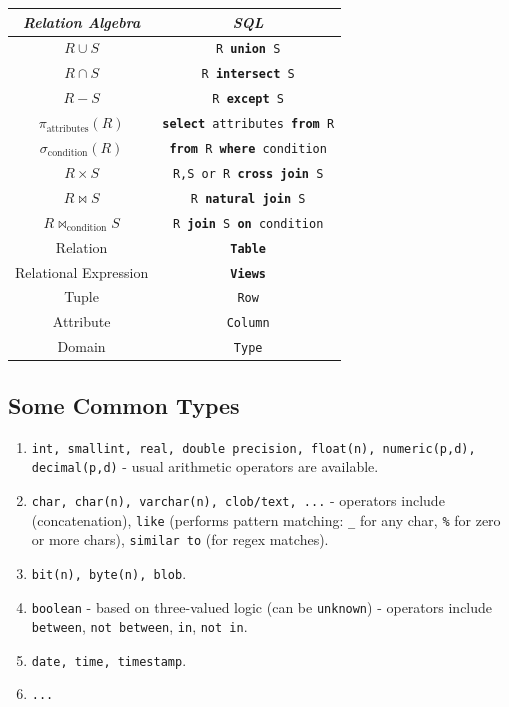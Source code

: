 \documentclass[twocolumn,english]{article}
\providecommand{\tabularnewline}{\\}
\providecommand{\tabularnewline}{\\}
\begin{document}
\noindent 
\begin{table}[H]
\noindent \centering{}%
\begin{tabular}{cc}
\toprule 
\addlinespace
\emph{Relation Algebra}  & \emph{SQL}\tabularnewline
\midrule
\addlinespace
$R\cup S$  & \texttt{R }\texttt{\textbf{union}}\texttt{ S}\tabularnewline
\addlinespace
$R\cap S$  & \texttt{R }\texttt{\textbf{intersect}}\texttt{ S}\tabularnewline
\addlinespace
$R-S$  & \texttt{R }\texttt{\textbf{except}}\texttt{ S}\tabularnewline
\addlinespace
$\pi_{\mbox{attributes}}\left(R\right)$  & \texttt{\textbf{select}}\texttt{ attributes }\texttt{\textbf{from}}\texttt{
R}\tabularnewline
\addlinespace
$\sigma_{\mbox{condition}}\left(R\right)$  & \texttt{\textbf{from}}\texttt{ R }\texttt{\textbf{where}}\texttt{
condition}\tabularnewline
\addlinespace
$R\times S$  & \texttt{R,S or R }\texttt{\textbf{cross join}}\texttt{ S}\tabularnewline
\addlinespace
$R\bowtie S$  & \texttt{R }\texttt{\textbf{natural join}}\texttt{ S}\tabularnewline
\addlinespace
$R\bowtie_{\mbox{condition}}S$  & \texttt{R }\texttt{\textbf{join}}\texttt{ S }\texttt{\textbf{on}}\texttt{
condition}\tabularnewline
\midrule
\addlinespace
Relation  & \texttt{\textbf{Table}}\tabularnewline
\addlinespace
Relational Expression  & \texttt{\textbf{Views}}\tabularnewline
\addlinespace
Tuple  & \texttt{Row}\tabularnewline
\addlinespace
Attribute  & \texttt{Column}\tabularnewline
\addlinespace
Domain  & \texttt{Type}\tabularnewline
\bottomrule
\end{tabular}
\end{table}



\subsection{Some Common Types}
\begin{enumerate}
\item \texttt{int, smallint, real, double precision, float(n), numeric(p,d),
decimal(p,d)} - usual arithmetic operators are available. 
\item \texttt{char, char(n), varchar(n), clob/text, ...} - operators include
\texttt{\textbar{}\textbar{}} (concatenation), \texttt{like} (performs
pattern matching: \texttt{\_} for any char, \texttt{\%} for zero or
more chars), \texttt{similar to} (for regex matches). 
\item \texttt{bit(n), byte(n), blob}. 
\item \texttt{boolean} - based on three-valued logic (can be \texttt{unknown})
- operators include \texttt{between}, \texttt{not between}, \texttt{in},
\texttt{not in}. 
\item \texttt{date, time, timestamp}. 
\item \texttt{...} 
\end{enumerate}
\end{document}
